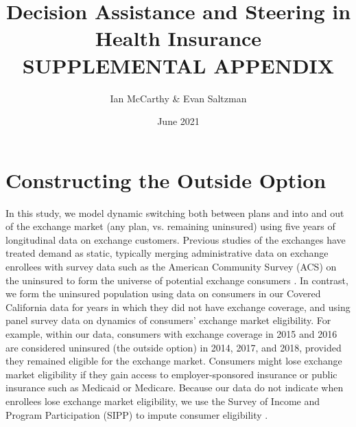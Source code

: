 \documentclass[12pt]{article}
\begin{document}
\title{Decision Assistance and Steering in Health Insurance \\
        SUPPLEMENTAL APPENDIX}
\author{Ian McCarthy \& Evan Saltzman}
\date{June 2021}
\maketitle

\renewcommand{\thetable}{A\arabic{table}}
\renewcommand{\thefigure}{A\arabic{figure}}

\section{Constructing the Outside Option}
\label{app:outside_option}

In this study, we model dynamic switching both between plans and into and out of the exchange market (any plan, vs. remaining uninsured) using five years of longitudinal data on exchange customers. Previous studies of the exchanges have treated demand as static, typically merging administrative data on exchange enrollees with survey data such as the American Community Survey (ACS) on the uninsured  to form the universe of potential exchange consumers \citep{Tebaldi2020,Domurat2017,saltzman2019}. In contrast, we form the uninsured population using data on consumers in our Covered California data for years in which they did not have exchange coverage, and using panel survey data on dynamics of consumers' exchange market eligibility. For example, within our data, consumers with exchange coverage in 2015 and 2016 are considered uninsured (the outside option) in 2014, 2017, and 2018, provided they remained eligible for the exchange market. Consumers might lose exchange market eligibility if they gain access to employer-sponsored insurance or public insurance such as Medicaid or Medicare. Because our data do not indicate when enrollees lose exchange market eligibility, we use the Survey of Income and Program Participation (SIPP) to impute consumer eligibility \citep{SIPP2019}.
	
\end{document}
